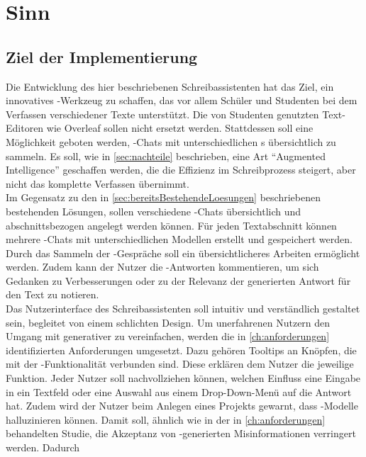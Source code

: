 \documentclass[../main.tex]{subfiles}
\begin{document}
\section{Sinn}

\subsection{Ziel der Implementierung}

Die Entwicklung des hier beschriebenen Schreibassistenten hat das Ziel, ein innovatives -Werkzeug zu schaffen, das vor allem Schüler und Studenten bei dem Verfassen 
verschiedener Texte unterstützt. Die von Studenten genutzten Text-Editoren wie Overleaf sollen nicht ersetzt werden. Stattdessen soll eine Möglichkeit geboten werden, 
-Chats mit unterschiedlichen s übersichtlich zu sammeln. Es soll, wie in \autoref{sec:nachteile} beschrieben, eine Art "`Augmented Intelligence"' geschaffen werden, die die Effizienz im Schreibprozess 
steigert, aber nicht das komplette Verfassen übernimmt.\\ Im Gegensatz zu den in \autoref{sec:bereitsBestehendeLoesungen} beschriebenen bestehenden Lösungen, sollen verschiedene -Chats 
übersichtlich und abschnittsbezogen angelegt werden können. Für jeden Textabschnitt können mehrere -Chats mit unterschiedlichen Modellen erstellt und gespeichert werden. Durch das Sammeln der -Gespräche soll ein übersichtlicheres Arbeiten ermöglicht werden. Zudem kann der Nutzer die -Antworten kommentieren, um sich Gedanken zu Verbesserungen oder zu der Relevanz der generierten Antwort für den Text zu notieren.\\
Das Nutzerinterface des Schreibassistenten soll intuitiv und verständlich gestaltet sein, begleitet von einem schlichten Design. Um unerfahrenen Nutzern den Umgang mit 
generativer  zu vereinfachen, werden die in \autoref{ch:anforderungen} identifizierten Anforderungen umgesetzt. Dazu gehören Tooltips an Knöpfen, die mit der 
-Funktionalität verbunden sind. Diese erklären dem Nutzer die jeweilige Funktion. Jeder Nutzer soll nachvollziehen können, welchen Einfluss eine Eingabe in 
ein Textfeld oder eine Auswahl aus einem Drop-Down-Menü auf die Antwort hat. Zudem wird der Nutzer beim Anlegen eines Projekts gewarnt, dass 
-Modelle halluzinieren können. Damit soll, ähnlich wie in der in \autoref{ch:anforderungen} behandelten Studie, die Akzeptanz von -generierten Misinformationen verringert werden. Dadurch 
\end{document}
